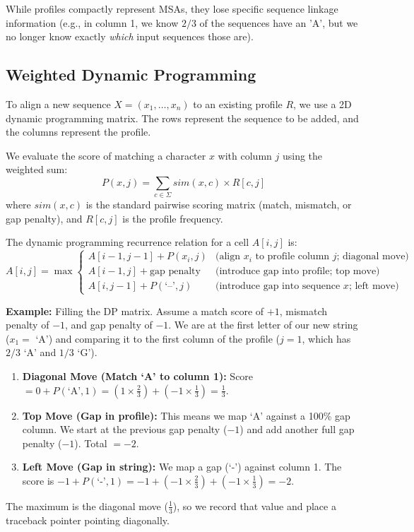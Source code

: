 \documentclass[11pt, a4paper]{article}
\begin{document}
While profiles compactly represent MSAs, they lose specific sequence linkage information (e.g., in column 1, we know $2/3$ of the sequences have an 'A', but we no longer know exactly \textit{which} input sequences those are). 

\subsection{Weighted Dynamic Programming}

To align a new sequence $X = (x_1, \dots, x_n)$ to an existing profile $R$, we use a 2D dynamic programming matrix. The rows represent the sequence to be added, and the columns represent the profile.

We evaluate the score of matching a character $x$ with column $j$ using the weighted sum:
\[
P(x, j) = \sum_{c \in \Sigma} sim(x, c) \times R[c, j]
\]
where $sim(x,c)$ is the standard pairwise scoring matrix (match, mismatch, or gap penalty), and $R[c,j]$ is the profile frequency.

The dynamic programming recurrence relation for a cell $A[i,j]$ is:
\[
A[i,j] = \max \begin{cases}
  A[i - 1, j - 1] + P(x_i, j) & \text{(align } x_i \text{ to profile column } j \text{; diagonal move)} \\
  A[i - 1, j] + \text{gap penalty} & \text{(introduce gap into profile; top move)} \\
  A[i, j - 1] + P(\text{`--'}, j) & \text{(introduce gap into sequence } x \text{; left move)}
\end{cases}
\]

\textbf{Example:} Filling the DP matrix.
Assume a match score of $+1$, mismatch penalty of $-1$, and gap penalty of $-1$. We are at the first letter of our new string ($x_1 =$ `A') and comparing it to the first column of the profile ($j=1$, which has $2/3$ `A' and $1/3$ `G').
\begin{enumerate}
    \item \textbf{Diagonal Move (Match `A' to column 1):} 
    Score $= 0 + P(\text{`A'}, 1) = (1 \times \frac{2}{3}) + (-1 \times \frac{1}{3}) = \frac{1}{3}$.
    \item \textbf{Top Move (Gap in profile):}
    This means we map `A' against a 100\% gap column. We start at the previous gap penalty ($-1$) and add another full gap penalty ($-1$). Total $= -2$.
    \item \textbf{Left Move (Gap in string):}
    We map a gap (`-') against column 1. The score is $-1 + P(\text{`-'}, 1) = -1 + (-1 \times \frac{2}{3}) + (-1 \times \frac{1}{3}) = -2$.
\end{enumerate}
The maximum is the diagonal move ($\frac{1}{3}$), so we record that value and place a traceback pointer pointing diagonally.
\end{document}
